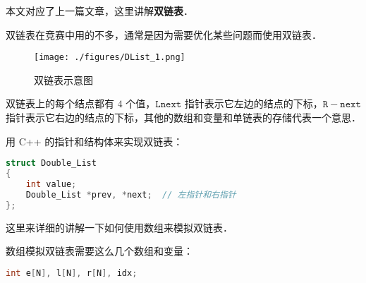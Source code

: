 
本文对应了上一篇文章，这里讲解\textbf{双链表}．

双链表在竞赛中用的不多，通常是因为需要优化某些问题而使用双链表．

\begin{figure}[ht]
\centering
\texttt{[image: ./figures/DList\_1.png]}
\caption{双链表示意图} \label{DList_fig1}
\end{figure}

双链表上的每个结点都有 $4$ 个值，$\mathtt{Lnext}$ 指针表示它左边的结点的下标，$\mathtt{R-next}$ 指针表示它右边的结点的下标，其他的数组和变量和单链表的存储代表一个意思．

用 C++ 的指针和结构体来实现双链表：
\begin{lstlisting}[language=cpp]
struct Double_List
{
    int value;
    Double_List *prev, *next;  // 左指针和右指针
};
\end{lstlisting}

这里来详细的讲解一下如何使用数组来模拟双链表．

数组模拟双链表需要这么几个数组和变量：
\begin{lstlisting}[language=cpp]
int e[N], l[N], r[N], idx;

\end{lstlisting}